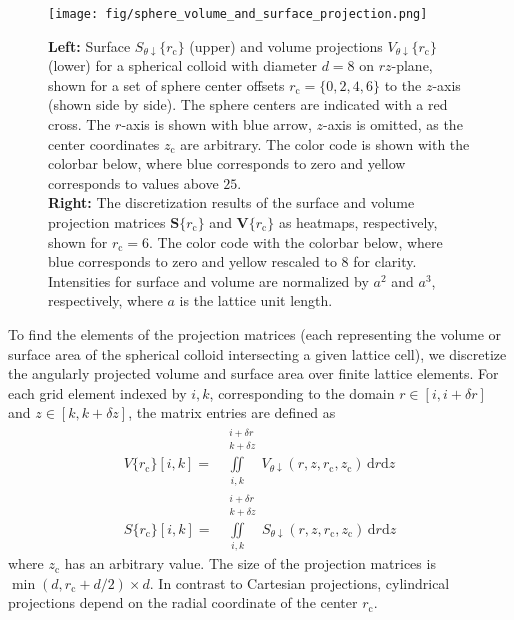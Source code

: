 \documentclass[10pt, a4paper, twocolumn]{article}
\begin{document}
\begin{figure}[]
    \centering
    \texttt{[image: fig/sphere\_volume\_and\_surface\_projection.png]}
    \caption{
        \textbf{Left:}
        Surface $S_{\theta \downarrow}\{r_{\text{c}}\}$ (upper) and volume projections $V_{\theta \downarrow}\{r_{\text{c}}\}$ (lower) for a spherical colloid with diameter $d = 8$ on $rz$-plane, shown for a set of sphere center offsets $r_{\text{c}} = \{0, 2, 4, 6\}$ to the $z$-axis (shown side by side).
        The sphere centers are indicated with a red cross.
        The $r$-axis is shown with blue arrow, $z$-axis is omitted, as the center coordinates $z_{\text{c}}$ are arbitrary.
        The color code is shown with the colorbar below, where blue corresponds to zero and yellow corresponds to values above $25$.
        \\
        \textbf{Right:}
        The discretization results of the surface and volume projection matrices $\bm{S}\{r_{\text{c}}\}$ and $\bm{V}\{r_{\text{c}}\}$ as heatmaps, respectively, shown for $r_{\text{c}} = 6$.
        The color code with the colorbar below, where blue corresponds to zero and yellow rescaled to $8$ for clarity.
        \\
        Intensities for surface and volume are normalized by $a^2$ and $a^3$, respectively, where $a$ is the lattice unit length.
    }
    \label{fig:sphere_volume_and_surface_projection}
\end{figure}

To find the elements of the projection matrices (each representing the volume or surface area of the spherical colloid intersecting a given lattice cell), we discretize the angularly projected volume and surface area over finite lattice elements.
For each grid element indexed by $i, k$, corresponding to the domain $r \in [i, i + \delta r]$ and $z \in [k, k + \delta z]$, the matrix entries  are defined as
\begin{eqnarray}
    V\{r_{\text{c}}\}{[i, k]} = \! \iint \limits_{i, k}^{\quad \substack{i+\delta r\\ k+\delta z}} \! V_{\theta \downarrow} (r, z, r_{\text{c}}, z_{\text{c}})\, \text{d}r \text{d}z
    \\
    S\{r_{\text{c}}\}{[i, k]} = \! \iint \limits_{i, k}^{\quad \substack{i+\delta r\\ k+\delta z}} \! S_{\theta \downarrow} (r, z, r_{\text{c}}, z_{\text{c}})\, \text{d}r \text{d}z
\end{eqnarray}
where $z_{\text{c}}$ has an arbitrary value.
The size of the projection matrices is $\min(d, r_{\text{c}} + d/2) \times d$.
In contrast to Cartesian projections, cylindrical projections depend on the radial coordinate of the center $r_{\text{c}}$.
\end{document}
